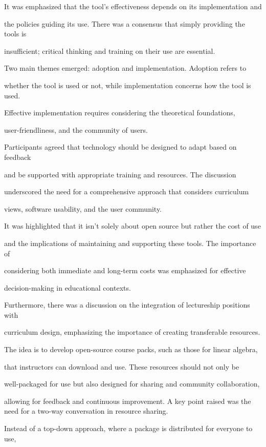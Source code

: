 \documentclass[11pt]{article}
\begin{document}
It was emphasized that the tool's effectiveness depends on its implementation and

the policies guiding its use. There was a consensus that simply providing the tools is

insufficient; critical thinking and training on their use are essential.

Two main themes emerged: adoption and implementation. Adoption refers to

whether the tool is used or not, while implementation concerns how the tool is used.

Effective implementation requires considering the theoretical foundations,

user-friendliness, and the community of users.

Participants agreed that technology should be designed to adapt based on feedback

and be supported with appropriate training and resources. The discussion

underscored the need for a comprehensive approach that considers curriculum

views, software usability, and the user community.

It was highlighted that it isn't solely about open source but rather the cost of use

and the implications of maintaining and supporting these tools. The importance of

considering both immediate and long-term costs was emphasized for effective

decision-making in educational contexts.

Furthermore, there was a discussion on the integration of lectureship positions with

curriculum design, emphasizing the importance of creating transferable resources.

The idea is to develop open-source course packs, such as those for linear algebra,

that instructors can download and use. These resources should not only be

well-packaged for use but also designed for sharing and community collaboration,

allowing for feedback and continuous improvement. A key point raised was the need for a two-way conversation in resource sharing.

Instead of a top-down approach, where a package is distributed for everyone to use,
\end{document}

